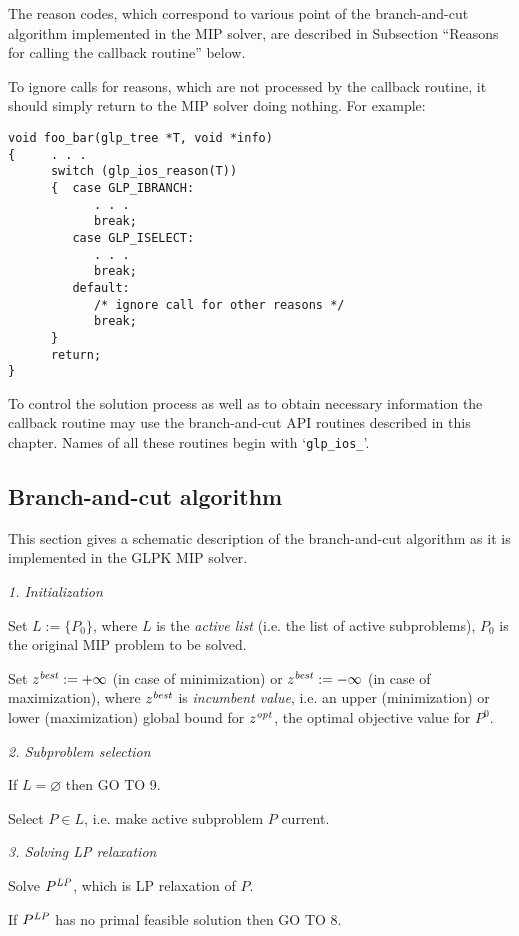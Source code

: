 The reason codes, which correspond to various point of the
branch-and-cut algorithm implemented in the MIP solver, are described
in Subsection ``Reasons for calling the callback routine'' below.

To ignore calls for reasons, which are not processed by the callback
routine, it should simply return to the MIP solver doing nothing. For
example:

\begin{verbatim}
void foo_bar(glp_tree *T, void *info)
{     . . .
      switch (glp_ios_reason(T))
      {  case GLP_IBRANCH:
            . . .
            break;
         case GLP_ISELECT:
            . . .
            break;
         default:
            /* ignore call for other reasons */
            break;
      }
      return;
}
\end{verbatim}

To control the solution process as well as to obtain necessary
information the callback routine may use the branch-and-cut API
routines described in this chapter. Names of all these routines begin
with `\verb|glp_ios_|'.

\subsection{Branch-and-cut algorithm}

This section gives a schematic description of the branch-and-cut
algorithm as it is implemented in the GLPK MIP solver.

{\it 1. Initialization}

Set $L:=\{P_0\}$, where $L$ is the {\it active list} (i.e. the list of
active subproblems), $P_0$ is the original MIP problem to be solved.

Set $z^{\it best}:=+\infty$ (in case of minimization) or
$z^{\it best}:=-\infty$ (in case of maximization), where $z^{\it best}$
is {\it incumbent value}, i.e. an upper (minimization) or lower
(maximization) global bound for $z^{\it opt}$, the optimal objective
value for $P^0$.

{\it 2. Subproblem selection}

If $L=\varnothing$ then GO TO 9.

Select $P\in L$, i.e. make active subproblem $P$ current.


{\it 3. Solving LP relaxation}

Solve $P^{\it LP}$, which is LP relaxation of $P$.

If $P^{\it LP}$ has no primal feasible solution then GO TO 8.

